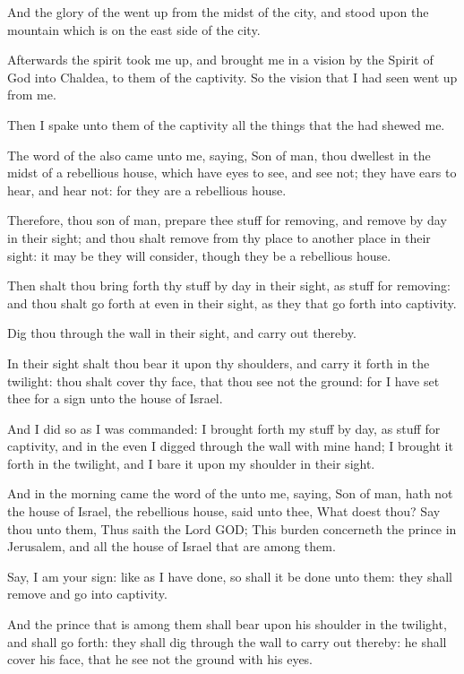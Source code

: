 \Verse And the glory of the \LORD went up from the midst of the city, and stood upon the mountain which is on the east side of the city.

\Verse Afterwards the spirit took me up, and brought me in a vision by the Spirit of God into Chaldea, to them of the captivity. So the vision that I had seen went up from me.

\Verse Then I spake unto them of the captivity all the things that the \LORD had shewed me.


\Chapter
\Verse The word of the \LORD also came unto me, saying, \Verse Son of man, thou dwellest in the midst of a rebellious house, which have eyes to see, and see not; they have ears to hear, and hear not: for they are a rebellious house.

\Verse Therefore, thou son of man, prepare thee stuff for removing, and remove by day in their sight; and thou shalt remove from thy place to another place in their sight: it may be they will consider, though they be a rebellious house.

\Verse Then shalt thou bring forth thy stuff by day in their sight, as stuff for removing: and thou shalt go forth at even in their sight, as they that go forth into captivity.

\Verse Dig thou through the wall in their sight, and carry out thereby.

\Verse In their sight shalt thou bear it upon thy shoulders, and carry it forth in the twilight: thou shalt cover thy face, that thou see not the ground: for I have set thee for a sign unto the house of Israel.

\Verse And I did so as I was commanded: I brought forth my stuff by day, as stuff for captivity, and in the even I digged through the wall with mine hand; I brought it forth in the twilight, and I bare it upon my shoulder in their sight.

\Verse And in the morning came the word of the \LORD unto me, saying, \Verse Son of man, hath not the house of Israel, the rebellious house, said unto thee, What doest thou?  \Verse Say thou unto them, Thus saith the Lord GOD; This burden concerneth the prince in Jerusalem, and all the house of Israel that are among them.

\Verse Say, I am your sign: like as I have done, so shall it be done unto them: they shall remove and go into captivity.

\Verse And the prince that is among them shall bear upon his shoulder in the twilight, and shall go forth: they shall dig through the wall to carry out thereby: he shall cover his face, that he see not the ground with his eyes.


